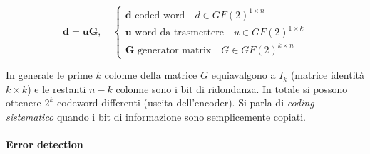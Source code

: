 \[
    \mathbf{d} = \mathbf{uG}, \quad \begin{cases}
        \mathbf{d} \text{ coded word} \quad d \in GF(2)^{1 \times n} \\
        \mathbf{u} \text{ word da trasmettere} \quad u \in GF(2)^{1 \times k} \\
        \mathbf{G} \text{ generator matrix} \quad G \in GF(2)^{k \times n}
    \end{cases}
\]

In generale le prime $k$ colonne della matrice $G$ equiavalgono a $I_k$ (matrice identità $k \times k$) e le restanti $n-k$ colonne sono i bit di ridondanza.
In totale si possono ottenere $2^k$ codeword differenti (uscita dell'encoder).
Si parla di \textit{coding sistematico} quando i bit di informazione sono semplicemente copiati.

\paragraph*{Error detection}

